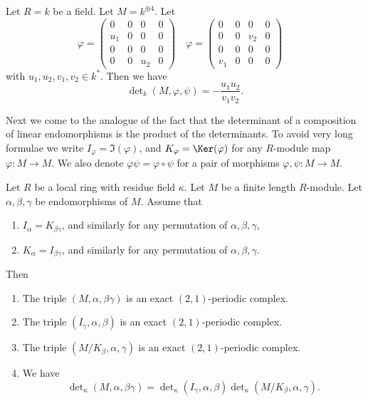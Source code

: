 \begin{example}
\label{example-a-la-oort}
Let $R = k$ be a field.
Let $M = k^{\oplus 4}$.
Let
$$
\varphi =
\left(
\begin{matrix}
  0 &   0 &   0 &   0 \\
u_1 &   0 &   0 &   0 \\
  0 &   0 &   0 &   0 \\
  0 &   0 & u_2 &   0
\end{matrix}
\right)
\quad
\varphi =
\left(
\begin{matrix}
  0 &   0 &   0 &   0 \\
  0 &   0 & v_2 &   0 \\
  0 &   0 &   0 &   0 \\
v_1 &   0 &   0 &   0
\end{matrix}
\right)
\quad
$$
with $u_1, u_2, v_1, v_2 \in k^*$.
Then we have
$$
\det\nolimits_k(M, \varphi, \psi) = -\frac{u_1u_2}{v_1v_2}.
$$
\end{example}

\noindent
Next we come to the analogue of the fact that the determinant
of a composition of linear endomorphisms is the product of
the determinants. To avoid very long formulae we
write $I_\varphi = \Im(\varphi)$, and
$K_\varphi = \Ker(\varphi)$
for any $R$-module map $\varphi : M \to M$.
We also denote $\varphi\psi = \varphi \circ \psi$
for a pair of morphisms $\varphi, \psi : M \to M$.

\begin{lemma}
\label{lemma-multiplicativity-determinant}
Let $R$ be a local ring with residue field $\kappa$.
Let $M$ be a finite length $R$-module.
Let $\alpha, \beta, \gamma$ be endomorphisms of $M$.
Assume that
\begin{enumerate}
\item $I_\alpha = K_{\beta\gamma}$, and similarly for any permutation
of $\alpha, \beta, \gamma$,
\item $K_\alpha = I_{\beta\gamma}$, and similarly for any permutation
of $\alpha, \beta, \gamma$.
\end{enumerate}
Then
\begin{enumerate}
\item The triple $(M, \alpha, \beta\gamma)$
is an exact $(2, 1)$-periodic complex.
\item The triple $(I_\gamma, \alpha, \beta)$
is an exact $(2, 1)$-periodic complex.
\item The triple $(M/K_\beta, \alpha, \gamma)$
is an exact $(2, 1)$-periodic complex.
\item We have
$$
\det\nolimits_\kappa(M, \alpha, \beta\gamma)
=
\det\nolimits_\kappa(I_\gamma, \alpha, \beta)
\det\nolimits_\kappa(M/K_\beta, \alpha, \gamma).
$$
\end{enumerate}
\end{lemma}

